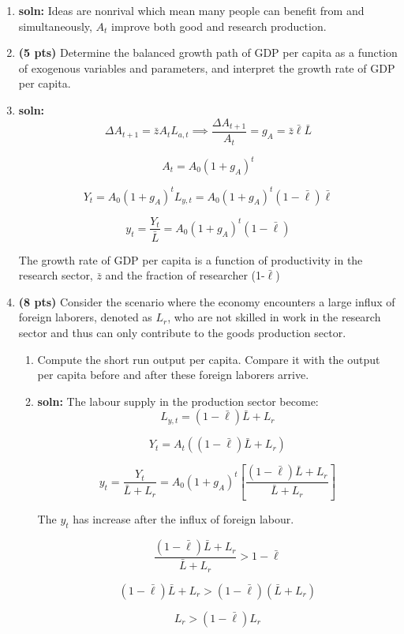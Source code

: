 \documentclass[14pt, oneside]{memoir}
\begin{document}
\begin{enumerate}[label=\textbf{\arabic*.}, itemsep=15pt]
\begin{enumerate}[label=(\alph*)]
	\vspace{1cm}
	\item[] \textbf{soln:} Ideas are nonrival which mean many people can benefit from and simultaneously, $A_t$ improve both good and research production.
	\clearpage
	\item \textbf{(5 pts)} 
	Determine the balanced growth path of GDP per capita as a function of exogenous variables and parameters, and interpret the growth rate of GDP per capita.
	\vspace{1cm}
	\item[] \textbf{soln:}
	\[\Delta A_{t+1} = \bar{z} A_t L_{a,t} \implies \frac{\Delta A_{t+1}}{A_t} = g_A = \bar{z} \bar{\ell} \bar{L}\]
	
	\[A_t = A_0 (1+g_A)^t\]
	
	\[Y_t = A_0 (1+g_A)^t L_{y,t} = A_0 (1+g_A)^t (1-\bar{\ell}) \bar{\ell}\]
	
	\[y_t = \frac{Y_t}{\bar{L}} = A_0 (1+g_A)^t (1-\bar{\ell})\]
	
	The growth rate of GDP per capita is a function of productivity in the research sector, $\bar{z}$ and the fraction of researcher (1-$\bar{\ell}$)
	\clearpage
	\item \textbf{(8 pts)} 	Consider the scenario where the economy encounters a large influx of foreign laborers, denoted as $L_r$, who are not skilled in work in the research sector and thus can only contribute to the goods production sector. 
	\begin{enumerate}
		\item Compute the short run output per capita. Compare it with the output per capita before and after these foreign laborers arrive. 
		\vspace{1cm}
		\item[] \textbf{soln:} The labour supply in the production sector become:
		\[L_{y,t} = (1-\bar{\ell}) \bar{L} + L_r\]
		
		\[Y_t = A_t \left((1-\bar{\ell}) \bar{L} + L_r\right)\]
		
		\[y_t = \frac{Y_t}{\bar{L} + L_r} = A_0 (1+g_A)^t \left[\frac{(1-\bar{\ell}) \bar{L} + L_r}{\bar{L} + L_r}\right]\]
		
		The $y_t$ has increase after the influx of foreign labour.
		
		\[\frac{(1-\bar{\ell}) \bar{L} + L_r}{\bar{L} + L_r} > 1-\bar{\ell}\]
		
		\[(1-\bar{\ell}) \bar{L} + L_r > (1-\bar{\ell}) (\bar{L} + L_r)\]
		
		\[L_r > (1-\bar{\ell}) L_r\]
		

\end{enumerate}
\end{enumerate}
\end{enumerate}
\end{document}
